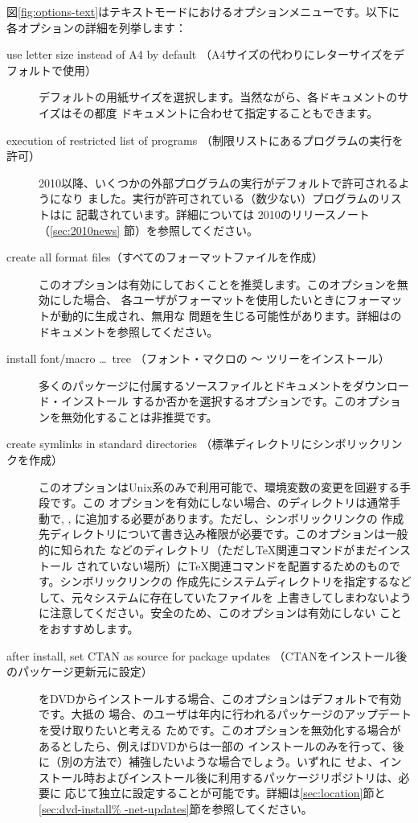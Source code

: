 \documentclass[uplatex,dvipdfmx]{jsarticle}
\begin{document}
図\ref{fig:options-text}はテキストモードにおけるオプションメニューです。以下に
各オプションの詳細を列挙します：
%
\begin{description}
\item[use letter size instead of A4 by default%
（A4サイズの代わりにレターサイズをデフォルトで使用）]
デフォルトの用紙サイズを選択します。当然ながら、各ドキュメントのサイズはその都度
ドキュメントに合わせて指定することもできます。

\item[execution of restricted list of programs%
（制限リストにあるプログラムの実行を許可）]
\TL{} 2010以降、いくつかの外部プログラムの実行がデフォルトで許可されるようになり
ました。実行が許可されている（数少ない）プログラムのリストはに
記載されています。詳細については\TL{} 2010のリリースノート（\ref{sec:2010news}%
節）を参照してください。

\item[create all format files（すべてのフォーマットファイルを作成）]
このオプションは有効にしておくことを推奨します。このオプションを無効にした場合、
各ユーザがフォーマットを使用したいときにフォーマットが動的に生成され、無用な
問題を生じる可能性があります。詳細はのドキュメントを参照してください。

\item[install font/macro \dots\ tree%
（フォント・マクロの 〜 ツリーをインストール）]
多くのパッケージに付属するソースファイルとドキュメントをダウンロード・インストール
するか否かを選択するオプションです。このオプションを無効化することは非推奨です。

\item[create symlinks in standard directories%
（標準ディレクトリにシンボリックリンクを作成）]
このオプションはUnix系のみで利用可能で、環境変数の変更を回避する手段です。この
オプションを有効にしない場合、\TL のディレクトリは通常手動で, , に追加する必要があります。ただし、シンボリックリンクの
作成先ディレクトリについて書き込み権限が必要です。このオプションは一般的に知られた
などのディレクトリ（ただし\TeX 関連コマンドがまだインストール
されていない場所）に\TeX 関連コマンドを配置するためのものです。シンボリックリンクの
作成先にシステムディレクトリを指定するなどして、元々システムに存在していたファイルを
上書きしてしまわないように注意してください。安全のため、このオプションは有効にしない
ことをおすすめします。

\item[after install, set CTAN as source for package updates%
（CTANをインストール後のパッケージ更新元に設定）]
\TL をDVDからインストールする場合、このオプションはデフォルトで有効です。大抵の
場合、\TL のユーザは年内に行われるパッケージのアップデートを受け取りたいと考える
ためです。このオプションを無効化する場合があるとしたら、例えばDVDからは一部の
インストールのみを行って、後に（別の方法で）補強したいような場合でしょう。いずれに
せよ、インストール時およびインストール後に利用するパッケージリポジトリは、必要に
応じて独立に設定することが可能です。詳細は\ref{sec:location}節と\ref{sec:dvd-install%
-net-updates}節を参照してください。
\end{description}
\end{document}
